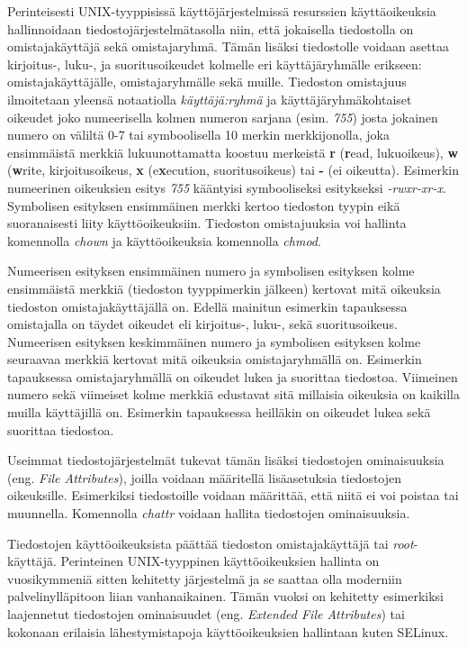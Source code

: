 Perinteisesti UNIX-tyyppisissä käyttöjärjestelmissä resurssien käyttäoikeuksia hallinnoidaan tiedostojärjestelmätasolla niin, että jokaisella tiedostolla on omistajakäyttäjä sekä omistajaryhmä. Tämän lisäksi tiedostolle voidaan asettaa kirjoitus-, luku-, ja suoritusoikeudet kolmelle eri käyttäjäryhmälle erikseen: omistajakäyttäjälle, omistajaryhmälle sekä muille. Tiedoston omistajuus ilmoitetaan yleensä notaatiolla \textit{käyttäjä:ryhmä} ja käyttäjäryhmäkohtaiset oikeudet joko numeerisella kolmen numeron sarjana (esim. \textit{755}) josta jokainen numero on väliltä 0-7 tai symboolisella 10 merkin merkkijonolla, joka ensimmäistä merkkiä lukuunottamatta koostuu merkeistä \textbf{r} (\textbf{r}ead, lukuoikeus), \textbf{w} (\textbf{w}rite, kirjoitusoikeus, \textbf{x} (e\textbf{x}ecution, suoritusoikeus) tai \textbf{-} (ei oikeutta). Esimerkin numeerinen oikeuksien esitys \textit{755} kääntyisi symbooliseksi esitykseksi \textit{-rwxr-xr-x}. Symbolisen esityksen ensimmäinen merkki kertoo tiedoston tyypin eikä suoranaisesti liity käyttöoikeuksiin. Tiedoston omistajuuksia voi hallinta komennolla \textit{chown} ja käyttöoikeuksia komennolla \textit{chmod}.

Numeerisen esityksen ensimmäinen numero ja symbolisen esityksen kolme ensimmäistä merkkiä (tiedoston tyyppimerkin jälkeen) kertovat mitä oikeuksia tiedoston omistajakäyttäjällä on. Edellä mainitun esimerkin tapauksessa omistajalla on täydet oikeudet eli kirjoitus-, luku-, sekä suoritusoikeus. Numeerisen esityksen keskimmäinen numero ja symbolisen esityksen kolme seuraavaa merkkiä kertovat mitä oikeuksia omistajaryhmällä on. Esimerkin tapauksessa omistajaryhmällä on oikeudet lukea ja suorittaa tiedostoa. Viimeinen numero sekä viimeiset kolme merkkiä edustavat sitä millaisia oikeuksia on kaikilla muilla käyttäjillä on. Esimerkin tapauksessa heilläkin on oikeudet lukea sekä suorittaa tiedostoa.

Useimmat tiedostojärjestelmät tukevat tämän lisäksi tiedostojen ominaisuuksia (eng. \textit{File Attributes}), joilla voidaan määritellä lisäasetuksia tiedostojen oikeuksille. Esimerkiksi tiedostoille voidaan määrittää, että niitä ei voi poistaa tai muunnella. Komennolla \textit{chattr} voidaan hallita tiedostojen ominaisuuksia.

Tiedostojen käyttöoikeuksista päättää tiedoston omistajakäyttäjä tai \textit{root}-käyttäjä. Perinteinen UNIX-tyyppinen käyttöoikeuksien hallinta on vuosikymmeniä sitten kehitetty järjestelmä ja se saattaa olla moderniin palvelinylläpitoon liian vanhanaikainen. Tämän vuoksi on kehitetty esimerkiksi laajennetut tiedostojen ominaisuudet (eng. \textit{Extended File Attributes}) tai kokonaan erilaisia lähestymistapoja käyttöoikeuksien hallintaan kuten SELinux.~\cite{kalsi2018practical}

